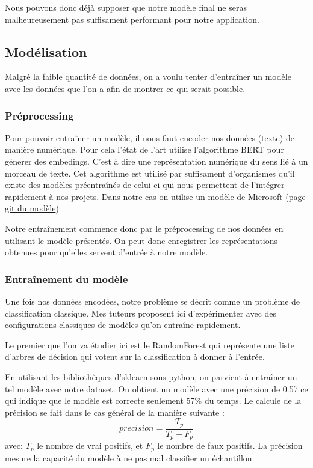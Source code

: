 \documentclass[oneside,a4paper,12pt]{article}
\begin{document}
	Nous pouvons donc déjà supposer que notre modèle final ne seras malheureusement pas suffisament performant pour notre application.
	 
	 
	\subsection{Modélisation}
	\label{training}
	
	Malgré la faible quantité de données, on a voulu tenter d'entraîner un modèle avec les données que l'on a afin de montrer ce qui serait possible.
	
	\subsubsection{Préprocessing}
	\label{preprocessing}
	Pour pouvoir entraîner un modèle, il nous faut encoder nos données (texte) de manière numérique. Pour cela l'état de l'art utilise l'algorithme BERT pour génerer des embedings. C'est à dire une représentation numérique du sens lié à un morceau de texte. Cet algorithme est utilisé par suffisament d'organismes qu'il existe des modèles préentraînés de celui-ci qui nous permettent de l'intégrer rapidement à nos projets. Dans notre cas on utilise un modèle de Microsoft (\href{https://github.com/microsoft/CodeBERT}{page git du modèle})
	
	Notre entraînement commence donc par le préprocessing de nos données en utilisant le modèle présentés. On peut donc enregistrer les représentations obtenues pour qu'elles servent d'entrée à notre modèle.
	
	\subsubsection{Entraînement du modèle}
	Une fois nos données encodées, notre problème se décrit comme un problème de classification classique. Mes tuteurs proposent ici d'expérimenter avec des configurations classiques de modèles qu'on entraîne rapidement.
	
	Le premier que l'on va étudier ici est le RandomForest qui représente une liste d'arbres de décision qui votent sur la classification à donner à l'entrée.
	
	En utilisant les bibliothèques d'sklearn sous python, on parvient à entraîner un tel modèle avec notre dataset.
	On obtient un modèle avec une précision de 0.57 ce qui indique que le modèle est correcte seulement 57\% du temps.
	Le calcule de la précision se fait dans le cas général de la manière suivante :
	$$ precision = \frac{T_p}{T_p + F_p} $$
	avec: $T_p$ le nombre de vrai positifs, et $F_p$ le nombre de faux positifs.
	La précision mesure la capacité du modèle à ne pas mal classifier un échantillon.
	
\end{document}
